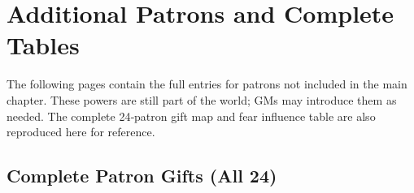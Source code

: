 \appendix
\chapter{Additional Patrons and Complete Tables}
\label{app:additional-patrons}

The following pages contain the full entries for patrons not included in the main chapter. These powers are still part of the world; GMs may introduce them as needed. The complete 24‑patron gift map and fear influence table are also reproduced here for reference.

\clearpage

\clearpage

\clearpage

\clearpage

\clearpage

\clearpage

\clearpage

\clearpage

\clearpage

\clearpage

\clearpage

\clearpage

\clearpage

\clearpage

\section{Complete Patron Gifts (All 24)}
\label{app:full-gift-table}

